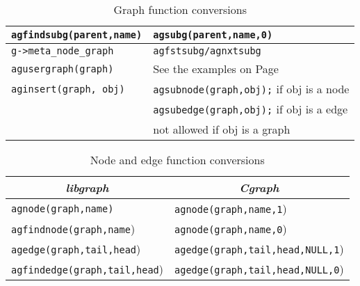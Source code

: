 \documentclass[11pt,letterpaper]{article}
\begin{document}
\begin{savenotes}
\begin{table*}[htb]
\begin{tabular}{|l|l|}
\verb"agfindsubg(parent,name)"      &   \verb"agsubg(parent,name,0)" \\ \hline
\verb"g->meta_node_graph"            &  \verb"agfstsubg/agnxtsubg" \\
\verb"agusergraph(graph)"  &  See the examples on Page~\pageref{subg}\\ \hline
\verb"aginsert(graph, obj)" &  \verb"agsubnode(graph,obj);" if obj is a node \\
                      &  \verb"agsubedge(graph,obj);" if obj is a edge \\
                      & not allowed if obj is a graph \\ \hline
\end{tabular}
\caption{Graph function conversions}
\label{table:libgraph:g}
\end{table*}

\begin{table*}[ht]
\centering
\begin{tabular}{|l|l|} \hline
\multicolumn{1}{|c|}{\em libgraph} & \multicolumn{1}{c|}{\em Cgraph} \\ \hline
\verb"agnode(graph,name)" & \verb"agnode(graph,name,1") \\ \hline
\verb"agfindnode(graph,name") & \verb"agnode(graph,name,0") \\ \hline
\verb"agedge(graph,tail,head") & \verb"agedge(graph,tail,head,NULL,1") \\ \hline
\verb"agfindedge(graph,tail,head") & \verb"agedge(graph,tail,head,NULL,0") \\ \hline
\end{tabular}
\caption{Node and edge function conversions}
\label{table:libgraph:n}
\end{table*}


\end{savenotes}
\end{document}
